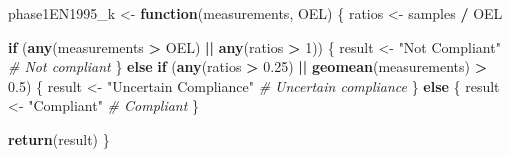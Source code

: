\documentclass[
]{article}
\newenvironment{Shaded}{\begin{snugshade}}{\end{snugshade}}
\newcommand{\CommentTok}[1]{\textcolor[rgb]{0.56,0.35,0.01}{\textit{#1}}}
\newcommand{\ControlFlowTok}[1]{\textcolor[rgb]{0.13,0.29,0.53}{\textbf{#1}}}
\newcommand{\DecValTok}[1]{\textcolor[rgb]{0.00,0.00,0.81}{#1}}
\newcommand{\FloatTok}[1]{\textcolor[rgb]{0.00,0.00,0.81}{#1}}
\newcommand{\FunctionTok}[1]{\textcolor[rgb]{0.13,0.29,0.53}{\textbf{#1}}}
\newcommand{\NormalTok}[1]{#1}
\newcommand{\OtherTok}[1]{\textcolor[rgb]{0.56,0.35,0.01}{#1}}
\newcommand{\SpecialCharTok}[1]{\textcolor[rgb]{0.81,0.36,0.00}{\textbf{#1}}}
\newcommand{\StringTok}[1]{\textcolor[rgb]{0.31,0.60,0.02}{#1}}
\begin{document}
\begin{Shaded}
\begin{Highlighting}[]
\NormalTok{phase1EN1995\_k }\OtherTok{\textless{}{-}} \ControlFlowTok{function}\NormalTok{(measurements, OEL) \{}
\NormalTok{  ratios }\OtherTok{\textless{}{-}}\NormalTok{ samples }\SpecialCharTok{/}\NormalTok{ OEL}
  
  \ControlFlowTok{if}\NormalTok{ (}\FunctionTok{any}\NormalTok{(measurements }\SpecialCharTok{\textgreater{}}\NormalTok{ OEL) }\SpecialCharTok{||} \FunctionTok{any}\NormalTok{(ratios }\SpecialCharTok{\textgreater{}} \DecValTok{1}\NormalTok{)) \{}
\NormalTok{    result }\OtherTok{\textless{}{-}} \StringTok{"Not Compliant"}  \CommentTok{\# Not compliant}
\NormalTok{  \} }\ControlFlowTok{else} \ControlFlowTok{if}\NormalTok{ (}\FunctionTok{any}\NormalTok{(ratios }\SpecialCharTok{\textgreater{}} \FloatTok{0.25}\NormalTok{) }\SpecialCharTok{||} \FunctionTok{geomean}\NormalTok{(measurements) }\SpecialCharTok{\textgreater{}} \FloatTok{0.5}\NormalTok{) \{}
\NormalTok{    result }\OtherTok{\textless{}{-}} \StringTok{"Uncertain Compliance"}  \CommentTok{\# Uncertain compliance}
\NormalTok{  \} }\ControlFlowTok{else}\NormalTok{ \{}
\NormalTok{    result }\OtherTok{\textless{}{-}} \StringTok{"Compliant"}   \CommentTok{\# Compliant}
\NormalTok{  \}}
  
  \FunctionTok{return}\NormalTok{(result)}
\NormalTok{\}}
\end{Highlighting}
\end{Shaded}
\end{document}
